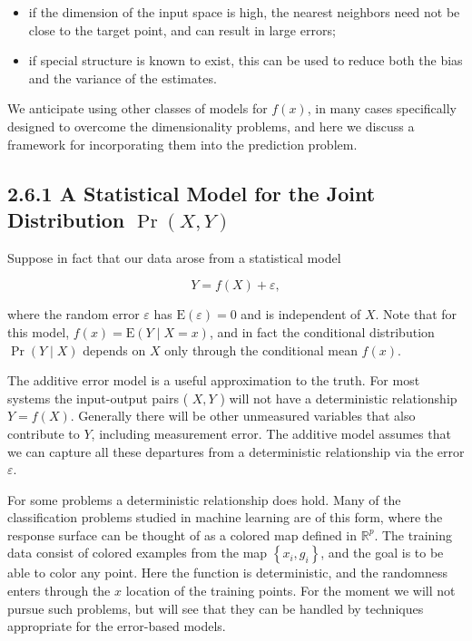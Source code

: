 \documentclass[10pt]{article}
\begin{document}
\begin{itemize}
  \item if the dimension of the input space is high, the nearest neighbors need not be close to the target point, and can result in large errors;
  \item if special structure is known to exist, this can be used to reduce both the bias and the variance of the estimates.
\end{itemize}

We anticipate using other classes of models for $f(x)$, in many cases specifically designed to overcome the dimensionality problems, and here we discuss a framework for incorporating them into the prediction problem.

\subsection*{2.6.1 A Statistical Model for the Joint Distribution $\operatorname{Pr}(X, Y)$}
Suppose in fact that our data arose from a statistical model


\begin{equation*}
Y=f(X)+\varepsilon, \tag{2.29}
\end{equation*}


where the random error $\varepsilon$ has $\mathrm{E}(\varepsilon)=0$ and is independent of $X$. Note that for this model, $f(x)=\mathrm{E}(Y \mid X=x)$, and in fact the conditional distribution $\operatorname{Pr}(Y \mid X)$ depends on $X$ only through the conditional mean $f(x)$.

The additive error model is a useful approximation to the truth. For most systems the input-output pairs ( $X, Y$ ) will not have a deterministic relationship $Y=f(X)$. Generally there will be other unmeasured variables that also contribute to $Y$, including measurement error. The additive model assumes that we can capture all these departures from a deterministic relationship via the error $\varepsilon$.

For some problems a deterministic relationship does hold. Many of the classification problems studied in machine learning are of this form, where the response surface can be thought of as a colored map defined in $\mathbb{R}^{p}$. The training data consist of colored examples from the map $\left\{x_{i}, g_{i}\right\}$, and the goal is to be able to color any point. Here the function is deterministic, and the randomness enters through the $x$ location of the training points. For the moment we will not pursue such problems, but will see that they can be handled by techniques appropriate for the error-based models.
\end{document}
